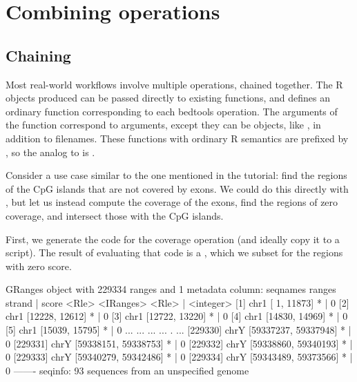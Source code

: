 \documentclass[10pt]{article}
\begin{document}
\section{Combining operations}

\subsection{Chaining}

Most real-world workflows involve multiple operations, chained
together. The R objects produced  can be passed
directly to existing \R{} functions, and  defines
an ordinary \R{} function corresponding to each bedtools operation.
The arguments of the function correspond to 
arguments, except they can be \R{} objects, like , in
addition to filenames. These functions with ordinary R semantics are
prefixed by , so the analog to
 is .

Consider a use case similar to the one mentioned in the
 tutorial: find the regions of the CpG islands that
are not covered by exons. We could do this directly with
, but let us instead compute the coverage
of the exons, find the regions of zero coverage, and intersect those
with the CpG islands. 

First, we generate the code for the coverage operation (and ideally
copy it to a script). The result of evaluating that code is a
, which we subset for the regions with zero score.
\begin{Schunk}
\begin{Soutput}
GRanges object with 229334 ranges and 1 metadata column:
           seqnames               ranges strand |     score
              <Rle>            <IRanges>  <Rle> | <integer>
       [1]     chr1       [    1, 11873]      * |         0
       [2]     chr1       [12228, 12612]      * |         0
       [3]     chr1       [12722, 13220]      * |         0
       [4]     chr1       [14830, 14969]      * |         0
       [5]     chr1       [15039, 15795]      * |         0
       ...      ...                  ...    ... .       ...
  [229330]     chrY [59337237, 59337948]      * |         0
  [229331]     chrY [59338151, 59338753]      * |         0
  [229332]     chrY [59338860, 59340193]      * |         0
  [229333]     chrY [59340279, 59342486]      * |         0
  [229334]     chrY [59343489, 59373566]      * |         0
  -------
  seqinfo: 93 sequences from an unspecified genome
\end{Soutput}
\end{Schunk}
\end{document}
